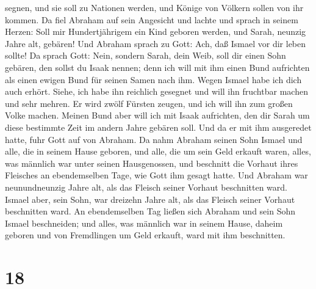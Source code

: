 segnen, und sie soll zu Nationen werden, und Könige von Völkern sollen
von ihr kommen.  Da fiel Abraham auf sein Angesicht und
lachte und sprach in seinem Herzen: Soll mir Hundertjährigem ein Kind
geboren werden, und Sarah, neunzig Jahre alt, gebären! 
Und Abraham sprach zu Gott: Ach, daß Ismael vor dir leben sollte!
 Da sprach Gott: Nein, sondern Sarah, dein Weib, soll dir
einen Sohn gebären, den sollst du Isaak nennen; denn ich will mit ihm
einen Bund aufrichten als einen ewigen Bund für seinen Samen nach ihm.
 Wegen Ismael habe ich dich auch erhört. Siehe, ich habe
ihn reichlich gesegnet und will ihn fruchtbar machen und sehr mehren. Er
wird zwölf Fürsten zeugen, und ich will ihn zum großen Volke machen.
 Meinen Bund aber will ich mit Isaak aufrichten, den dir
Sarah um diese bestimmte Zeit im andern Jahre gebären soll.
 Und da er mit ihm ausgeredet hatte, fuhr Gott auf von
Abraham.  Da nahm Abraham seinen Sohn Ismael und alle,
die in seinem Hause geboren, und alle, die um sein Geld erkauft waren,
alles, was männlich war unter seinen Hausgenossen, und beschnitt die
Vorhaut ihres Fleisches an ebendemselben Tage, wie Gott ihm gesagt
hatte.  Und Abraham war neunundneunzig Jahre alt, als das
Fleisch seiner Vorhaut beschnitten ward.  Ismael aber,
sein Sohn, war dreizehn Jahre alt, als das Fleisch seiner Vorhaut
beschnitten ward.  An ebendemselben Tag ließen sich
Abraham und sein Sohn Ismael beschneiden;  und alles, was
männlich war in seinem Hause, daheim geboren und von Fremdlingen um Geld
erkauft, ward mit ihm beschnitten.

\hypertarget{section-17}{%
\section{18}\label{section-17}}


